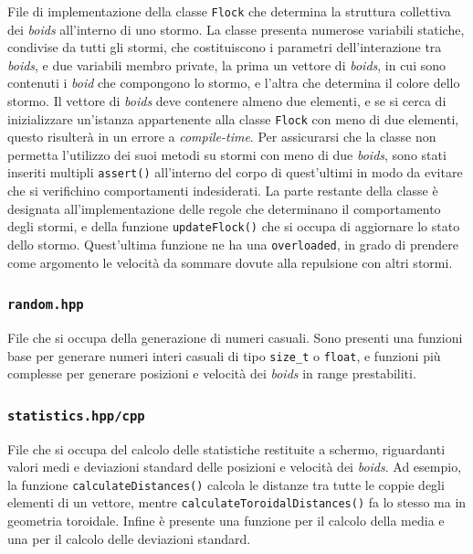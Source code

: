 \documentclass[10pt,a4paper]{article}
\begin{document}
File di implementazione della classe \texttt{Flock} che determina la struttura collettiva dei \textit{boids} all'interno di uno stormo. La classe presenta numerose variabili statiche, condivise da tutti gli stormi, che costituiscono i parametri dell'interazione tra \textit{boids}, e due variabili membro private, la prima un vettore di \textit{boids}, in cui sono contenuti i \textit{boid} che compongono lo stormo, e l'altra che determina il colore dello stormo. Il vettore di \textit{boids} deve contenere almeno due elementi, e se si cerca di inizializzare un'istanza appartenente alla classe \texttt{Flock} con meno di due elementi, questo risulterà in un errore a \textit{compile-time}. Per assicurarsi che la classe non permetta l'utilizzo dei suoi metodi su stormi con meno di due \textit{boids}, sono stati inseriti multipli \texttt{assert()} all'interno del corpo di quest'ultimi in modo da evitare che si verifichino comportamenti indesiderati. La parte restante della classe è designata all'implementazione delle regole che determinano il comportamento degli stormi, e della funzione \texttt{updateFlock()} che si occupa di aggiornare lo stato dello stormo. Quest'ultima funzione ne ha una \texttt{overloaded}, in grado di prendere come argomento le velocità da sommare dovute alla repulsione con altri stormi.

\subsubsection{\texttt{random.hpp}}

File che si occupa della generazione di numeri casuali. Sono presenti una funzioni base per generare numeri interi casuali di tipo \texttt{size\_t} o \texttt{float}, e funzioni più complesse per generare posizioni e velocità dei \textit{boids} in range prestabiliti.

\subsubsection{\texttt{statistics.hpp/cpp}}

File che si occupa del calcolo delle statistiche restituite a schermo, riguardanti valori medi e deviazioni standard delle posizioni e velocità dei \textit{boids}. Ad esempio, la funzione \texttt{calculateDistances()} calcola le distanze tra tutte le coppie degli elementi di un vettore, mentre \texttt{calculateToroidalDistances()} fa lo stesso ma in geometria toroidale. Infine è presente una funzione per il calcolo della media e una per il calcolo delle deviazioni standard.
\end{document}
